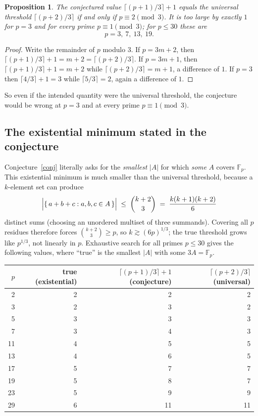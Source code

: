 \documentclass[11pt]{article}
\newtheorem{proposition}[theorem]{Proposition}
\theoremstyle{definition}
\theoremstyle{remark}
\begin{document}
\begin{proposition}\label{prop:conj-vs-univ}
The conjectured value $\lceil (p+1)/3 \rceil + 1$ equals the universal
threshold $\lceil (p+2)/3 \rceil$ if and only if $p \equiv 2 \pmod 3$. It is
too large by exactly $1$ for $p = 3$ and for every prime $p \equiv 1 \pmod 3$;
for $p \le 30$ these are
\[
  p = 3,\ 7,\ 13,\ 19 .
\]
\end{proposition}

\begin{proof}
Write the remainder of $p$ modulo $3$. If $p = 3m + 2$, then
$\lceil (p+1)/3 \rceil + 1 = m + 2 = \lceil (p+2)/3 \rceil$. If $p = 3m+1$,
then $\lceil (p+1)/3 \rceil + 1 = m + 2$ while $\lceil (p+2)/3 \rceil = m+1$,
a difference of $1$. If $p = 3$ then $\lceil 4/3 \rceil + 1 = 3$ while
$\lceil 5/3 \rceil = 2$, again a difference of $1$.
\end{proof}

So even if the intended quantity were the universal threshold, the conjecture
would be wrong at $p = 3$ and at every prime $p \equiv 1 \pmod 3$.

\subsection{The existential minimum stated in the conjecture}

Conjecture~\ref{conj} literally asks for the \emph{smallest} $|A|$ for which
\emph{some} $A$ covers $\mathbb{F}_p$. This existential minimum is much
smaller than the universal threshold, because a $k$-element set can produce
\[
  \Bigl|\{\,a+b+c : a,b,c \in A\,\}\Bigr| \;\le\; \binom{k+2}{3}
  \;=\; \frac{k(k+1)(k+2)}{6}
\]
distinct sums (choosing an unordered multiset of three summands). Covering all
$p$ residues therefore forces $\binom{k+2}{3} \ge p$, so
$k \gtrsim (6p)^{1/3}$; the true threshold grows like $p^{1/3}$, not linearly
in $p$. Exhaustive search for all primes $p \le 30$ gives the following
values, where ``true'' is the smallest $|A|$ with some $3A = \mathbb{F}_p$.

\begin{center}
\begin{tabular}{r|r|r|r}
$p$ & true (existential) & $\lceil (p+1)/3 \rceil + 1$ (conjecture)
    & $\lceil (p+2)/3 \rceil$ (universal) \\ \hline
 2 & 2 &  2 &  2 \\
 3 & 2 &  3 &  2 \\
 5 & 3 &  3 &  3 \\
 7 & 3 &  4 &  3 \\
11 & 4 &  5 &  5 \\
13 & 4 &  6 &  5 \\
17 & 5 &  7 &  7 \\
19 & 5 &  8 &  7 \\
23 & 5 &  9 &  9 \\
29 & 6 & 11 & 11
\end{tabular}
\end{center}
\end{document}
